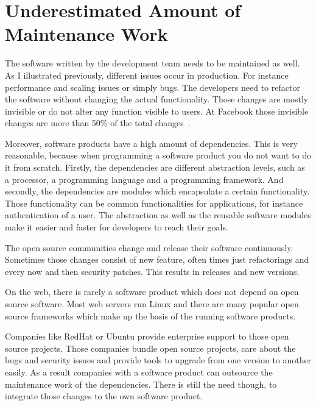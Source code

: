 \section{Underestimated Amount of Maintenance Work}

The software written by the development team needs to be maintained as well. As I
illustrated previously, different issues occur in production. For instance performance and
scaling issues or simply bugs. The developers need to refactor the software without
changing the actual functionality. Those changes are mostly invisible or do not alter any
function visible to users. At Facebook those invisible changes are more than 50\% of the
total changes~\cite{dev_at_fb}.

Moreover, software products have a high amount of dependencies. This is very reasonable,
because when programming a software product you do not want to do it from
scratch. Firstly, the dependencies are different abstraction levels, such as a processor,
a programming language and a programming framework. And secondly, the dependencies are
modules which encapsulate a certain functionality. Those functionality can be common
functionalities for applications, for instance authentication of a user. The abstraction
as well as the reusable software modules make it easier and faster for developers to reach
their goals.

The open source communities change and release their software continuously. Sometimes
those changes consist of new feature, often times just refactorings and every now and then
security patches. This results in releases and new versions.

On the web, there is rarely a software product which does not depend on open source
software. Most web servers run Linux and there are many popular open source frameworks
which make up the basis of the running software products.

Companies like RedHat or Ubuntu provide enterprise support to those open source
projects. Those companies bundle open source projects, care about the bugs and
security issues and provide tools to upgrade from one version to another easily. As a
result companies with a software product can outsource the maintenance work of the
dependencies. There is still the need though, to integrate those changes to the own
software product.

